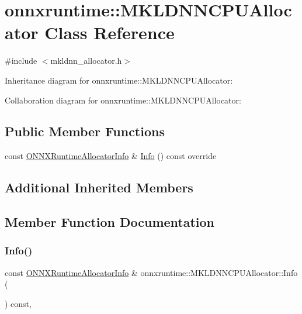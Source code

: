 \hypertarget{classonnxruntime_1_1MKLDNNCPUAllocator}{}\section{onnxruntime\+:\+:M\+K\+L\+D\+N\+N\+C\+P\+U\+Allocator Class Reference}
\label{classonnxruntime_1_1MKLDNNCPUAllocator}


{\ttfamily \#include $<$mkldnn\+\_\+allocator.\+h$>$}



Inheritance diagram for onnxruntime\+:\+:M\+K\+L\+D\+N\+N\+C\+P\+U\+Allocator\+:


Collaboration diagram for onnxruntime\+:\+:M\+K\+L\+D\+N\+N\+C\+P\+U\+Allocator\+:
\subsection*{Public Member Functions}
\begin{DoxyCompactItemize}
\item 
const \mbox{\hyperlink{structONNXRuntimeAllocatorInfo}{O\+N\+N\+X\+Runtime\+Allocator\+Info}} \& \mbox{\hyperlink{classonnxruntime_1_1MKLDNNCPUAllocator_ab5ed702febdae0ac4d7d6f17c3534cc7}{Info}} () const override
\end{DoxyCompactItemize}
\subsection*{Additional Inherited Members}


\subsection{Member Function Documentation}
\mbox{\label{classonnxruntime_1_1MKLDNNCPUAllocator_ab5ed702febdae0ac4d7d6f17c3534cc7}} 
\subsubsection{\texorpdfstring{Info()}{Info()}}
{\footnotesize\ttfamily const \mbox{\hyperlink{structONNXRuntimeAllocatorInfo}{O\+N\+N\+X\+Runtime\+Allocator\+Info}} \& onnxruntime\+::\+M\+K\+L\+D\+N\+N\+C\+P\+U\+Allocator\+::\+Info (\begin{DoxyParamCaption}{ }\end{DoxyParamCaption}) const\hspace{0.3cm}{\ttfamily [override]}, {\ttfamily [virtual]}}




